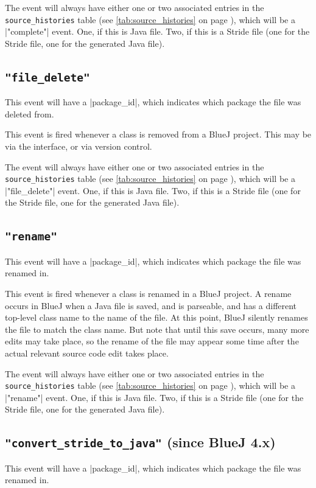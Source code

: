 \documentclass{report}
\newcommand{\myref}[1]{\autoref{#1} on page \pageref*{#1}}
\newcommand{\tabref}[1]{\lstinline|#1| table (see \myref{tab:#1})}
\begin{document}
The event will always have either one or two associated entries in the
\tabref{source_histories}, which will be a |"complete"| event.  One, if this
is Java file.  Two, if this is a Stride file (one for the Stride file, one
for the generated Java file).

\subsection{\lstinline!"file_delete"!}

This event will have a |package_id|, which indicates which package the file
was deleted from.

This event is fired whenever a class is removed from a BlueJ project.  This
may be via the interface, or via version control.

The event will always have either one or two associated entries in the
\tabref{source_histories}, which will be a |"file_delete"| event.  One, if this
is Java file.  Two, if this is a Stride file (one for the Stride file, one
for the generated Java file).

\subsection{\lstinline!"rename"!}

This event will have a |package_id|, which indicates which package the file
was renamed in.

This event is fired whenever a class is renamed in a BlueJ project.  A rename
occurs in BlueJ when a Java file is saved, and is parseable, and has a
different top-level class name to the name of the file.  At this point, BlueJ
silently renames the file to match the class name.  But note that until this
save occurs, many more edits may take place, so the rename of the file may
appear some time after the actual relevant source code edit takes place.

The event will always have either one or two associated entries in the
\tabref{source_histories}, which will be a |"rename"| event.  One, if this
is Java file.  Two, if this is a Stride file (one for the Stride file, one
for the generated Java file).

\subsection{\lstinline!"convert_stride_to_java"! (since BlueJ 4.x)}

This event will have a |package_id|, which indicates which package the file
was renamed in.
\end{document}
